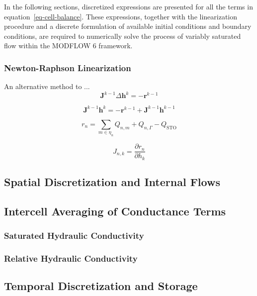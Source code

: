 \documentclass[fleqn]{article}
\begin{document}
In the following sections, discretized expressions are presented for
all the terms in equation~\ref{eq-cell-balance}. These expressions,
together with the linearization procedure and a discrete
formulation of available initial conditions and boundary conditions, 
are required to numerically solve the process of variably saturated 
flow within the MODFLOW 6 framework.

\subsubsection*{Newton-Raphson Linearization}
An alternative method to ...
\begin{equation}
  \mathbf{J}^{k-1} \Delta \mathbf{h}^k = -\mathbf{r}^{k-1}
\end{equation}

\begin{equation}
  \mathbf{J}^{k-1} \mathbf{h}^k = 
  -\mathbf{r}^{k-1} + \mathbf{J}^{k-1} \mathbf{h}^{k-1}
\end{equation}

\begin{equation}
  r_n = \sum_{m \in \eta_n} Q_{n,m} + 
        Q_{n, \Gamma} - 
        Q_{\textrm{STO}}
\end{equation}

\begin{equation}
  J_{n,k} = \frac{\partial r_n}{\partial h_k}
\end{equation}

\subsection{Spatial Discretization and Internal Flows}
\subsection{Intercell Averaging of Conductance Terms}\label{sec-cond-avg}
\subsubsection*{Saturated Hydraulic Conductivity}
\subsubsection*{Relative Hydraulic Conductivity}
\subsection{Temporal Discretization and Storage}
\end{document}
